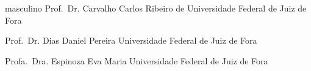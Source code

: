 \DefineCoorientador%
{masculino}
{Prof.\ Dr.}
{Carvalho}
{Carlos Ribeiro de}
{Universidade Federal de Juiz de Fora}

\DefineExaminadorUm%
{Prof.\ Dr.}
{Dias}
{Daniel Pereira}
{Universidade Federal de Juiz de Fora}

\DefineExaminadorDois%
{Profa.\ Dra.}
{Espinoza}
{Eva Maria}
{Universidade Federal de Juiz de Fora}




